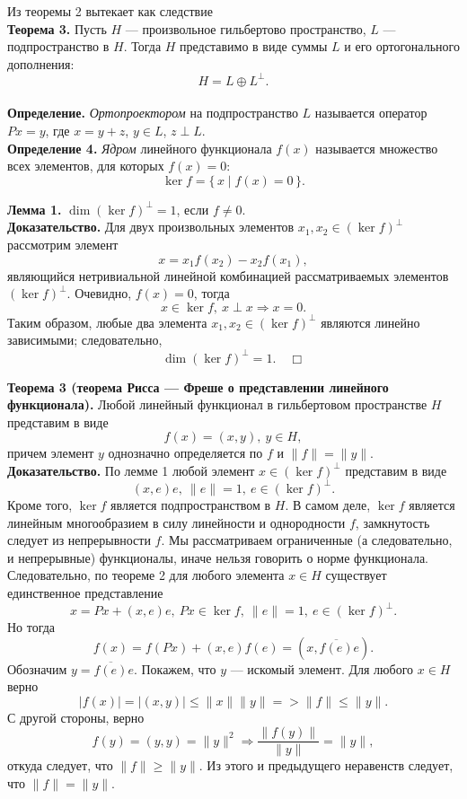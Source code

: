 \documentclass[12pt,a4paper, titlepage]{article}
\begin{document}
Из теоремы 2 вытекает как следствие\\
\textbf{Теорема 3.} Пусть $H$ --- произвольное гильбертово пространство, $L$ --- подпространство в $H$. Тогда $H$ представимо в виде суммы $L$ и его ортогонального дополнения:
$$
H = L \oplus L^\perp.
$$ \\

\textbf{Определение.} \textit{Ортопроектором} на подпространство $L$ называется оператор $Px = y$, где $x = y + z$, $y \in L$, $z \perp L$.\\

\textbf{Определение 4.} \textit{Ядром} линейного функционала $f(x)$ называется множество всех элементов, для которых $f(x) = 0$:
$$
\ker f = \{\,x \mid f(x) = 0\,\}.
$$

\textbf{Лемма 1.} $\dim (\ker f)^{\perp} = 1$, если $f \neq 0.$\\
\textbf{Доказательство.} Для двух произвольных элементов $x_1, x_2 \in (\ker f)^\perp$ рассмотрим элемент
$$
x = x_1 f(x_2) - x_2 f(x_1),
$$
являющийся нетривиальной линейной комбинацией рассматриваемых элементов $(\ker f)^\perp$.
Очевидно, $f(x) = 0$, тогда 
$$
x \in \ker f,\ x \perp x \Rightarrow x = 0.
$$
Таким образом, любые два элемента $x_1, x_2 \in (\ker f)^\perp$ являются линейно зависимыми; следовательно,
$$
\dim (\ker f)^{\perp} = 1. \quad \Box
$$

\textbf{Теорема 3 (теорема Рисса --- Фреше о представлении линейного функционала).} Любой линейный функционал в гильбертовом пространстве $H$ представим в виде
$$
f(x) = (x, y),\ y \in H,
$$
причем элемент $y$ однозначно определяется по $f$ и $\|f\| = \|y\|$.\\

\textbf{Доказательство.} По лемме 1 любой элемент $x \in (\ker f)^\perp$ представим в виде 
$$
(x, e)e,\ \|e\| = 1,\ e \in (\ker f)^\perp.
$$ 
Кроме того, $\ker f$ является подпространством в $H$. В самом деле, $\ker f$ является линейным многообразием в силу линейности и однородности $f$, замкнутость следует из непрерывности $f$. Мы рассматриваем ограниченные (а следовательно, и непрерывные) функционалы, иначе нельзя говорить о норме функционала.\\

Следовательно, по теореме 2 для любого элемента $x \in H$ существует единственное представление
$$
x = Px + (x, e) e,\ Px \in \ker f,\ \|e\| = 1,\ e \in (\ker f)^\perp.
$$
Но тогда
$$
f(x) = f(Px) + (x, e) f(e) = (x, \overline{f(e)} e).
$$
Обозначим $y = \overline{f(e)}e$. Покажем, что $y$ --- искомый элемент. Для любого $x \in H$ верно
$$
|f(x)| = |(x, y)| \leqslant \|x\| \|y\| => \|f\| \leqslant \|y\|.
$$
С другой стороны, верно 
$$
f(y) = (y, y) = \|y\|^2 \Rightarrow \frac{\|f(y)\|}{\|y\|} = \|y\|,
$$
откуда следует, что $\|f\| \geqslant \|y\|$. Из этого и предыдущего неравенств следует, что $\|f\| = \| y\|$.\\
\end{document}
